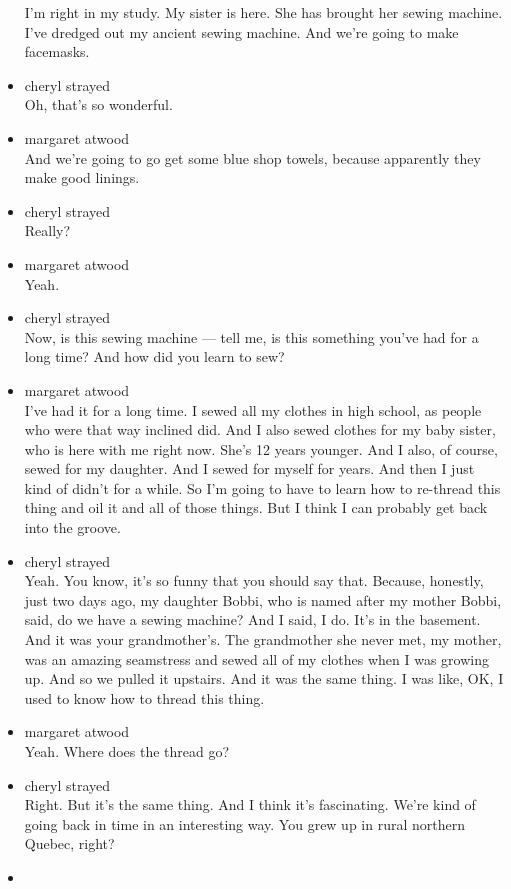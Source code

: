 \begin{itemize}
  I'm right in my study. My sister is here. She has brought her sewing
  machine. I've dredged out my ancient sewing machine. And we're going
  to make facemasks.
\item
  cheryl strayed\\
  Oh, that's so wonderful.
\item
  margaret atwood\\
  And we're going to go get some blue shop towels, because apparently
  they make good linings.
\item
  cheryl strayed\\
  Really?
\item
  margaret atwood\\
  Yeah.
\item
  cheryl strayed\\
  Now, is this sewing machine --- tell me, is this something you've had
  for a long time? And how did you learn to sew?
\item
  margaret atwood\\
  I've had it for a long time. I sewed all my clothes in high school, as
  people who were that way inclined did. And I also sewed clothes for my
  baby sister, who is here with me right now. She's 12 years younger.
  And I also, of course, sewed for my daughter. And I sewed for myself
  for years. And then I just kind of didn't for a while. So I'm going to
  have to learn how to re-thread this thing and oil it and all of those
  things. But I think I can probably get back into the groove.
\item
  cheryl strayed\\
  Yeah. You know, it's so funny that you should say that. Because,
  honestly, just two days ago, my daughter Bobbi, who is named after my
  mother Bobbi, said, do we have a sewing machine? And I said, I do.
  It's in the basement. And it was your grandmother's. The grandmother
  she never met, my mother, was an amazing seamstress and sewed all of
  my clothes when I was growing up. And so we pulled it upstairs. And it
  was the same thing. I was like, OK, I used to know how to thread this
  thing.
\item
  margaret atwood\\
  Yeah. Where does the thread go?
\item
  cheryl strayed\\
  Right. But it's the same thing. And I think it's fascinating. We're
  kind of going back in time in an interesting way. You grew up in rural
  northern Quebec, right?
\item

\end{itemize}
